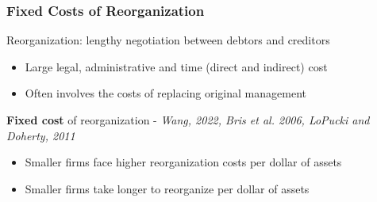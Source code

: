 \documentclass[aspectratio=169,xcolor=table]{beamer}
\begin{document}
\begin{frame}[label = FCreorg] \frametitle{Fixed Costs of Reorganization \hfill \hyperlink{Model Summary}{}}



Reorganization: lengthy negotiation between debtors and creditors 
\begin{itemize} \small 
    \item Large legal, administrative and time (direct and indirect)  cost
    \item Often involves the costs of replacing original management
\end{itemize} \normalsize \vspace{10mm}  

\textbf{Fixed cost} of reorganization - \footnotesize \textit{Wang, 2022,  Bris et al. 2006, LoPucki and Doherty, 2011} 
\begin{itemize} \small 
    \item Smaller firms face higher reorganization costs per dollar of assets
    \item Smaller firms take longer to reorganize per dollar of assets \hfill \hyperlink{daysin111}{}
\end{itemize} \normalsize \vspace{3mm}



\end{frame}
\end{document}
